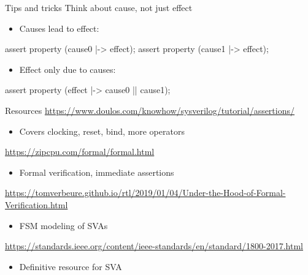 \documentclass{beamer}
\begin{document}
\begin{frame}[fragile]{Tips and tricks}
Think about cause, not just effect

\pause
\begin{itemize}
 \item Causes lead to effect:
\end{itemize}

\begin{semiverbatim}
assert property (cause0 |-> effect);
assert property (cause1 |-> effect);
\end{semiverbatim}

\pause
\begin{itemize}
 \item Effect only due to causes:
\end{itemize}

\begin{semiverbatim}
assert property (effect |-> cause0 || cause1);
\end{semiverbatim}

\end{frame}


\begin{frame}{Resources}
\url{https://www.doulos.com/knowhow/sysverilog/tutorial/assertions/}
\begin{itemize}
 \item Covers clocking, reset, bind, more operators
\end{itemize}
\vspace{\baselineskip}

\url{https://zipcpu.com/formal/formal.html}
\begin{itemize}
 \item Formal verification, immediate assertions
\end{itemize}
\vspace{\baselineskip}

\url{https://tomverbeure.github.io/rtl/2019/01/04/Under-the-Hood-of-Formal-Verification.html}
\begin{itemize}
 \item FSM modeling of SVAs
\end{itemize}
\vspace{\baselineskip}

\url{https://standards.ieee.org/content/ieee-standards/en/standard/1800-2017.html}
\begin{itemize}
 \item Definitive resource for SVA
\end{itemize}
\end{frame}
\end{document}
